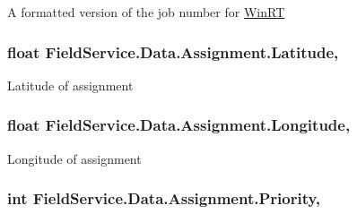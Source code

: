 A formatted version of the job number for \hyperlink{namespace_field_service_1_1_win_r_t}{Win\+R\+T} 

\hypertarget{class_field_service_1_1_data_1_1_assignment_aa14382e3a7da3b85825d3e6f7568106b}{
\subsubsection[{Latitude}]{\setlength{\rightskip}{0pt plus 5cm}float Field\+Service.\+Data.\+Assignment.\+Latitude\hspace{0.3cm}{\ttfamily [get]}, {\ttfamily [set]}}}\label{class_field_service_1_1_data_1_1_assignment_aa14382e3a7da3b85825d3e6f7568106b}


Latitude of assignment 

\hypertarget{class_field_service_1_1_data_1_1_assignment_adee085d31938622d1d932efb03fb3233}{
\subsubsection[{Longitude}]{\setlength{\rightskip}{0pt plus 5cm}float Field\+Service.\+Data.\+Assignment.\+Longitude\hspace{0.3cm}{\ttfamily [get]}, {\ttfamily [set]}}}\label{class_field_service_1_1_data_1_1_assignment_adee085d31938622d1d932efb03fb3233}


Longitude of assignment 

\hypertarget{class_field_service_1_1_data_1_1_assignment_a36ac0add7b96a5f3902a15e8a7131639}{
\subsubsection[{Priority}]{\setlength{\rightskip}{0pt plus 5cm}int Field\+Service.\+Data.\+Assignment.\+Priority\hspace{0.3cm}{\ttfamily [get]}, {\ttfamily [set]}}}\label{class_field_service_1_1_data_1_1_assignment_a36ac0add7b96a5f3902a15e8a7131639}


